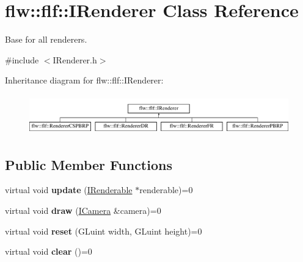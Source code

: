 \hypertarget{classflw_1_1flf_1_1IRenderer}{}\section{flw\+:\+:flf\+:\+:I\+Renderer Class Reference}
\label{classflw_1_1flf_1_1IRenderer}


Base for all renderers.  




{\ttfamily \#include $<$I\+Renderer.\+h$>$}

Inheritance diagram for flw\+:\+:flf\+:\+:I\+Renderer\+:\begin{figure}[H]
\begin{center}
\leavevmode
\includegraphics[height=1.739130cm]{classflw_1_1flf_1_1IRenderer}
\end{center}
\end{figure}
\subsection*{Public Member Functions}
\begin{DoxyCompactItemize}
\item 
virtual void {\bfseries update} (\hyperlink{classflw_1_1flf_1_1IRenderable}{I\+Renderable} $\ast$renderable)=0\hypertarget{classflw_1_1flf_1_1IRenderer_a3e7f0895caa92e95056be3404e28e788}{}\label{classflw_1_1flf_1_1IRenderer_a3e7f0895caa92e95056be3404e28e788}

\item 
virtual void {\bfseries draw} (\hyperlink{classflw_1_1flf_1_1ICamera}{I\+Camera} \&camera)=0\hypertarget{classflw_1_1flf_1_1IRenderer_a6b634d60f3fd4b6a28ec21cd7497208a}{}\label{classflw_1_1flf_1_1IRenderer_a6b634d60f3fd4b6a28ec21cd7497208a}

\item 
virtual void {\bfseries reset} (G\+Luint width, G\+Luint height)=0\hypertarget{classflw_1_1flf_1_1IRenderer_ac90ec601eac15ad54071f62078241c89}{}\label{classflw_1_1flf_1_1IRenderer_ac90ec601eac15ad54071f62078241c89}

\item 
virtual void {\bfseries clear} ()=0\hypertarget{classflw_1_1flf_1_1IRenderer_a425c79dae2088f55289aa69fabfa7bbe}{}\label{classflw_1_1flf_1_1IRenderer_a425c79dae2088f55289aa69fabfa7bbe}

\end{DoxyCompactItemize}
